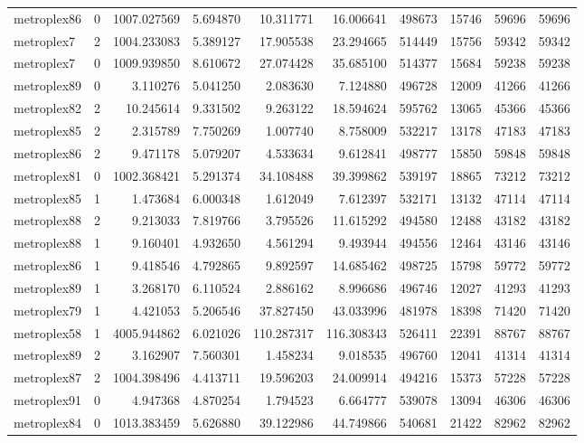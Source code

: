 \begin{longtable}{|l|r|r|r|r|r|r|r|r|r|}
metroplex86 & 0 & 1007.027569 & 5.694870 & 10.311771 & 16.006641 & 498673 & 15746 & 59696 & 59696 \\
metroplex7 & 2 & 1004.233083 & 5.389127 & 17.905538 & 23.294665 & 514449 & 15756 & 59342 & 59342 \\
metroplex7 & 0 & 1009.939850 & 8.610672 & 27.074428 & 35.685100 & 514377 & 15684 & 59238 & 59238 \\
metroplex89 & 0 & 3.110276 & 5.041250 & 2.083630 & 7.124880 & 496728 & 12009 & 41266 & 41266 \\
metroplex82 & 2 & 10.245614 & 9.331502 & 9.263122 & 18.594624 & 595762 & 13065 & 45366 & 45366 \\
metroplex85 & 2 & 2.315789 & 7.750269 & 1.007740 & 8.758009 & 532217 & 13178 & 47183 & 47183 \\
metroplex86 & 2 & 9.471178 & 5.079207 & 4.533634 & 9.612841 & 498777 & 15850 & 59848 & 59848 \\
metroplex81 & 0 & 1002.368421 & 5.291374 & 34.108488 & 39.399862 & 539197 & 18865 & 73212 & 73212 \\
metroplex85 & 1 & 1.473684 & 6.000348 & 1.612049 & 7.612397 & 532171 & 13132 & 47114 & 47114 \\
metroplex88 & 2 & 9.213033 & 7.819766 & 3.795526 & 11.615292 & 494580 & 12488 & 43182 & 43182 \\
metroplex88 & 1 & 9.160401 & 4.932650 & 4.561294 & 9.493944 & 494556 & 12464 & 43146 & 43146 \\
metroplex86 & 1 & 9.418546 & 4.792865 & 9.892597 & 14.685462 & 498725 & 15798 & 59772 & 59772 \\
metroplex89 & 1 & 3.268170 & 6.110524 & 2.886162 & 8.996686 & 496746 & 12027 & 41293 & 41293 \\
metroplex79 & 1 & 4.421053 & 5.206546 & 37.827450 & 43.033996 & 481978 & 18398 & 71420 & 71420 \\
metroplex58 & 1 & 4005.944862 & 6.021026 & 110.287317 & 116.308343 & 526411 & 22391 & 88767 & 88767 \\
metroplex89 & 2 & 3.162907 & 7.560301 & 1.458234 & 9.018535 & 496760 & 12041 & 41314 & 41314 \\
metroplex87 & 2 & 1004.398496 & 4.413711 & 19.596203 & 24.009914 & 494216 & 15373 & 57228 & 57228 \\
metroplex91 & 0 & 4.947368 & 4.870254 & 1.794523 & 6.664777 & 539078 & 13094 & 46306 & 46306 \\
metroplex84 & 0 & 1013.383459 & 5.626880 & 39.122986 & 44.749866 & 540681 & 21422 & 82962 & 82962 \\

\end{longtable}

